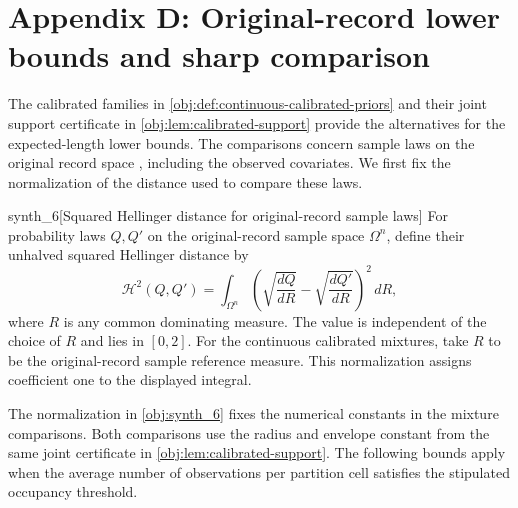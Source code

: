 \section{Appendix D: Original-record lower bounds and sharp comparison}

The calibrated families in \cref{obj:def:continuous-calibrated-priors} and their joint support certificate in \cref{obj:lem:calibrated-support} provide the alternatives for the expected-length lower bounds. The comparisons concern sample laws on the original record space , including the observed covariates. We first fix the normalization of the distance used to compare these laws.

\begin{definitionv}{synth_6}[Squared Hellinger distance for original-record sample laws]
For probability laws \(Q,Q'\) on the original-record sample space \(\Omega^n\), define their unhalved squared Hellinger distance by
\[
\mathcal H^2(Q,Q')
=
\int_{\Omega^n}
\left(
\sqrt{\frac{dQ}{dR}}
-
\sqrt{\frac{dQ'}{dR}}
\right)^2\,dR,
\]
where \(R\) is any common dominating measure. The value is independent of the choice of \(R\) and lies in \([0,2]\). For the continuous calibrated mixtures, take \(R\) to be the original-record sample reference measure. This normalization assigns coefficient one to the displayed integral.
\end{definitionv}

The normalization in \cref{obj:synth_6} fixes the numerical constants in the mixture comparisons. Both comparisons use the radius and envelope constant from the same joint certificate in \cref{obj:lem:calibrated-support}. The following bounds apply when the average number of observations per partition cell satisfies the stipulated occupancy threshold.

